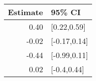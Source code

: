 \begin{tabular}{rl}
  \hline
Estimate & 95\% CI \\ 
  \hline
0.40 & [0.22,0.59] \\ 
  -0.02 & [-0.17,0.14] \\ 
  -0.44 & [-0.99,0.11] \\ 
  0.02 & [-0.4,0.44] \\ 
   \hline
\end{tabular}

